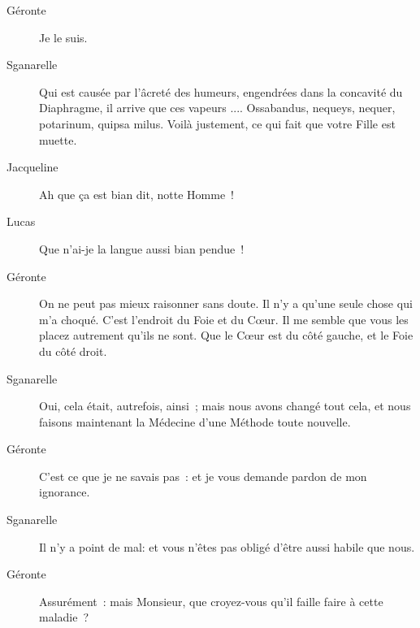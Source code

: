 \documentclass[french,twoside]{book} %
\begin{document}
 \begin{description} \item[Géronte] 

Je le suis.\end{description}
 \begin{description} \item[Sganarelle] 

Qui est causée par l’âcreté des humeurs, engendrées dans la concavité du Diaphragme, il arrive que ces vapeurs .... Ossabandus, nequeys, nequer, potarinum, quipsa milus. Voilà justement, ce qui fait que votre Fille est muette.\end{description}
 \begin{description} \item[Jacqueline] 

Ah que ça est bian dit, notte Homme !\end{description}
 \begin{description} \item[Lucas] 

Que n’ai-je la langue aussi bian pendue !\end{description}
 \begin{description} \item[Géronte] 

On ne peut pas mieux raisonner sans doute. Il n’y a qu’une seule chose qui m’a choqué. C’est l’endroit du Foie et du Cœur. Il me semble que vous les placez autrement qu’ils ne sont. Que le Cœur est du côté gauche, et le Foie du côté droit.\end{description}
 \begin{description} \item[Sganarelle] 

Oui, cela était, autrefois, ainsi ; mais nous avons changé tout cela, et nous faisons maintenant la Médecine d’une Méthode toute nouvelle.\end{description}
 \begin{description} \item[Géronte] 

C’est ce que je ne savais pas : et je vous demande pardon de mon ignorance.\end{description}
 \begin{description} \item[Sganarelle] 

Il n’y a point de mal: et vous n’êtes pas obligé d’être aussi habile que nous.\end{description}
 \begin{description} \item[Géronte] 

Assurément : mais Monsieur, que croyez-vous qu’il faille faire à cette maladie ?\end{description}
\end{document}
